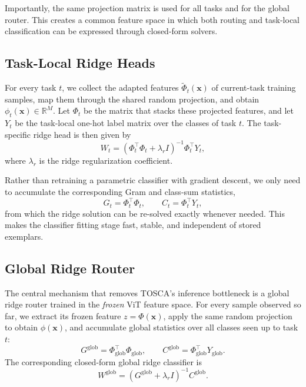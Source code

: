 \documentclass{article}
\begin{document}
Importantly, the same projection matrix is used for all tasks and for the
global router. This creates a common feature space in which both routing and
task-local classification can be expressed through closed-form solvers.

\subsection{Task-Local Ridge Heads}
\label{subsec:method-local-ridge}

For every task \(t\), we collect the adapted features
\(\tilde{\Phi}_t(\mathbf{x})\) of current-task training samples, map them
through the shared random projection, and obtain
\(\phi_t(\mathbf{x}) \in \mathbb{R}^{M}\). Let \(\Phi_t\) be the matrix that
stacks these projected features, and let \(Y_t\) be the task-local one-hot
label matrix over the classes of task \(t\). The task-specific ridge head is
then given by
\begin{equation}
    W_t =
    \left(\Phi_t^\top \Phi_t + \lambda_r I\right)^{-1}\Phi_t^\top Y_t,
\end{equation}
where \(\lambda_r\) is the ridge regularization coefficient.

Rather than retraining a parametric classifier with gradient descent, we only
need to accumulate the corresponding Gram and class-sum statistics,
\begin{equation}
    G_t = \Phi_t^\top \Phi_t,
    \qquad
    C_t = \Phi_t^\top Y_t,
\end{equation}
from which the ridge solution can be re-solved exactly whenever needed. This
makes the classifier fitting stage fast, stable, and independent of stored
exemplars.

\subsection{Global Ridge Router}
\label{subsec:method-global-router}

The central mechanism that removes TOSCA's inference bottleneck is a global
ridge router trained in the \emph{frozen} ViT feature space. For every
sample observed so far, we extract its frozen feature \(z=\Phi(\mathbf{x})\),
apply the same random projection to obtain \(\phi(\mathbf{x})\), and
accumulate global statistics over all classes seen up to task \(t\):
\begin{equation}
    G^{\mathrm{glob}} = \Phi_{\mathrm{glob}}^\top \Phi_{\mathrm{glob}},
    \qquad
    C^{\mathrm{glob}} = \Phi_{\mathrm{glob}}^\top Y_{\mathrm{glob}}.
\end{equation}
The corresponding closed-form global ridge classifier is
\begin{equation}
    W^{\mathrm{glob}} =
    \left(G^{\mathrm{glob}} + \lambda_r I\right)^{-1} C^{\mathrm{glob}}.
\end{equation}
\end{document}
